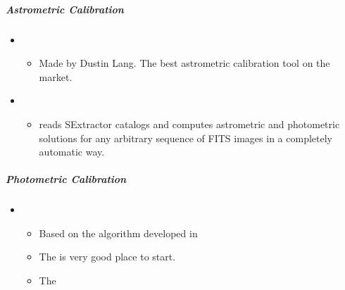 \documentclass[letterpaper,10pt,english]{sphinxmanual}
\begin{document}
\subparagraph{Astrometric Calibration}
\label{\detokenize{resource/astro/topics/ccd_reduction:astrometric-calibration}}\begin{itemize}
\item {} 
\begin{itemize}
\item {} 
Made by Dustin Lang. The best astrometric calibration tool on the
market.

\end{itemize}

\item {} 
\begin{itemize}
\item {} 
 reads SExtractor catalogs and computes astrometric and
photometric solutions for any arbitrary sequence of FITS images in
a completely automatic way.

\end{itemize}

\end{itemize}


\subparagraph{Photometric Calibration}
\label{\detokenize{resource/astro/topics/ccd_reduction:photometric-calibration}}\begin{itemize}
\item {} 
\begin{itemize}
\item {} 
Based on the algorithm developed in 

\item {} 
The 
is very good place to start.

\item {} 
The 

\end{itemize}

\end{itemize}
\end{document}
